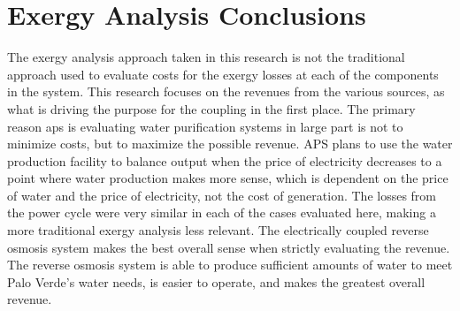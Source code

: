 \section{Exergy Analysis Conclusions}

The exergy analysis approach taken in this research is not the traditional approach used to evaluate costs for the exergy losses at each of the components in the system.  This research focuses on the revenues from the various sources, as what is driving the purpose for the coupling in the first place.  The primary reason \ac{aps} is evaluating water purification systems in large part is not to minimize costs, but to maximize the possible revenue.  APS plans to use the water production facility to balance output when the price of electricity decreases to a point where water production makes more sense, which is dependent on the price of water and the price of electricity, not the cost of generation. The losses from the power cycle were very similar in each of the cases evaluated here, making a more traditional exergy analysis less relevant. The electrically coupled reverse osmosis system makes the best overall sense when strictly evaluating the revenue.  The reverse osmosis system is able to produce sufficient amounts of water to meet Palo Verde's water needs, is easier to operate, and makes the greatest overall revenue.

